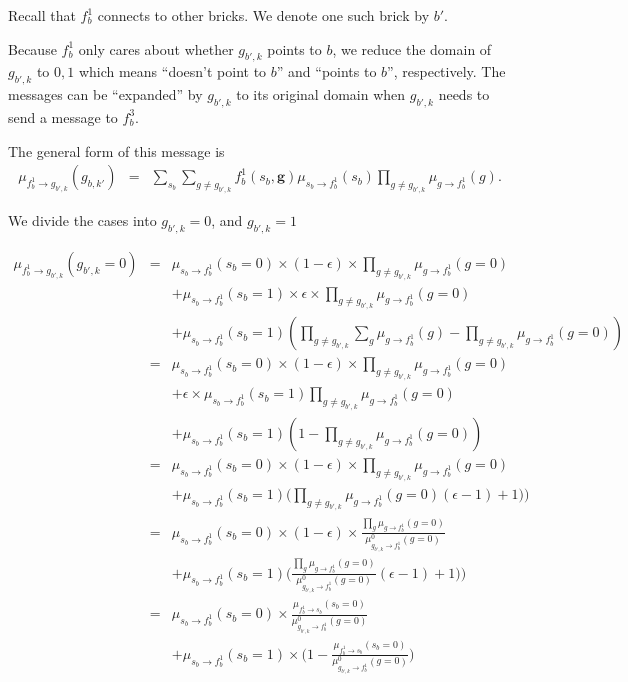 \documentclass[11pt]{article}
\newcommand{\fb}[1]{f_b^{#1}}
\newcommand{\mSbFb}[1]{\mu_{s_{b} \rightarrow \fb{#1}}}
\newcommand{\mFbSb}[1]{\mu_{ \fb{#1} \rightarrow s_{b}}}
\begin{document}
Recall that $\fb1$ connects to other bricks. We denote one such brick by $b'$.

Because $\fb1$ only cares about whether $g_{b',k}$ points to $b$, we reduce the domain of $g_{b',k}$ to $0,1$ which means ``doesn't point to $b$'' and ``points to $b$'', respectively. The messages can be ``expanded'' by $g_{b',k}$ to its original domain when $g_{b',k}$ needs to send a message to $\fb3$.

The general form of this message is
\begin{eqnarray}
\mu_{\fb1 \rightarrow g_{b',k}}(g_{b,k'}) &=& \sum_{s_b} \sum_{g \neq g_{b',k}} \fb1(s_b,\mathbf{g}) \mSbFb1(s_b) \prod_{g \neq g_{b',k}} \mu_{g \rightarrow \fb1}(g).
\end{eqnarray}

We divide the cases into  $g_{b',k}=0$, and  $g_{b',k}=1$

\begin{eqnarray}
\mu_{\fb1 \rightarrow g_{b',k}}(g_{b',k}=0) &=& \mSbFb1(s_b=0) \times (1-\epsilon)  \times   \prod_{g \neq g_{b',k}}\mu_{g \rightarrow \fb1}(g=0) \\
& & +  \mSbFb1(s_b=1) \times \epsilon \times \prod_{g \neq g_{b',k}}\mu_{g \rightarrow \fb1}(g=0) \nonumber \\
& & +  \mSbFb1(s_b=1) (\prod_{g \neq g_{b',k}}\sum_{g} \mu_{g \rightarrow \fb1}(g) - \prod_{g \neq g_{b',k}} \mu_{g \rightarrow \fb1}(g=0) )  \nonumber \\
%
&=&  \mSbFb1(s_b=0) \times (1-\epsilon)  \times  \prod_{g \neq g_{b',k}}\mu_{g \rightarrow \fb1}(g=0) \\
& & + \epsilon \times \mSbFb1(s_b=1) \prod_{g \neq g_{b',k}}\mu_{g \rightarrow \fb1}(g=0) \nonumber \\
& & +  \mSbFb1(s_b=1) (1 - \prod_{g \neq g_{b',k}} \mu_{g \rightarrow \fb1}(g=0)) \nonumber \\
%
&=& \mSbFb1(s_b=0) \times (1-\epsilon)  \times  \prod_{g \neq g_{b',k}}\mu_{g \rightarrow \fb1}(g=0) \nonumber \\
& & +  \mSbFb1(s_b=1) \big(   \prod_{g \neq g_{b',k}} \mu_{g \rightarrow \fb1}(g=0)  (\epsilon -1) + 1)  \big) \\
&=&   \mSbFb1(s_b=0) \times (1-\epsilon)  \times \frac{ \prod_{g}\mu_{g \rightarrow \fb1}(g=0)}{\mu^0_{g_{b',k} \rightarrow \fb1}(g=0)}  \\
& & + \mSbFb1(s_b=1) \big( \frac{\prod_{g} \mu_{g \rightarrow \fb1}(g=0) }{\mu^0_{g_{b',k} \rightarrow \fb1}(g=0) }
 (\epsilon -1) + 1)  \big) \nonumber \\
&=&   \mSbFb1(s_b=0)  \times \frac{\mFbSb1(s_b=0)}{\mu^0_{g_{b',k} \rightarrow \fb1}(g=0)}  \\
& & + \mSbFb1(s_b=1) \times \big(1- \frac{\mFbSb1(s_b=0)}{\mu^0_{g_{b',k} \rightarrow \fb1}(g=0)}  \big) \nonumber
\end{eqnarray}
\end{document}
